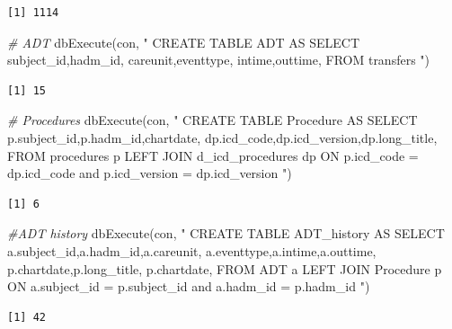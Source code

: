 \documentclass[
]{article}
\newenvironment{Shaded}{\begin{snugshade}}{\end{snugshade}}
\newcommand{\CommentTok}[1]{\textcolor[rgb]{0.56,0.35,0.01}{\textit{#1}}}
\newcommand{\FunctionTok}[1]{\textcolor[rgb]{0.00,0.00,0.00}{#1}}
\newcommand{\NormalTok}[1]{\textcolor[rgb]{0.00,0.00,0.00}{#1}}
\newcommand{\StringTok}[1]{\textcolor[rgb]{0.31,0.60,0.02}{#1}}
\begin{document}
\begin{verbatim}
[1] 1114
\end{verbatim}

\begin{Shaded}
\begin{Highlighting}[]
\CommentTok{\# ADT }
\FunctionTok{dbExecute}\NormalTok{(con, }\StringTok{"}
\StringTok{  CREATE TABLE ADT AS}
\StringTok{  SELECT}
\StringTok{    subject\_id,hadm\_id,}
\StringTok{    careunit,eventtype,}
\StringTok{    intime,outtime,}
\StringTok{  FROM transfers}
\StringTok{"}\NormalTok{)}
\end{Highlighting}
\end{Shaded}

\begin{verbatim}
[1] 15
\end{verbatim}

\begin{Shaded}
\begin{Highlighting}[]
\CommentTok{\# Procedures}
\FunctionTok{dbExecute}\NormalTok{(con, }\StringTok{"}
\StringTok{  CREATE TABLE Procedure AS}
\StringTok{  SELECT }
\StringTok{    p.subject\_id,p.hadm\_id,chartdate,  }
\StringTok{    dp.icd\_code,dp.icd\_version,dp.long\_title, }
\StringTok{  FROM procedures p}
\StringTok{  LEFT JOIN d\_icd\_procedures dp}
\StringTok{  ON p.icd\_code = dp.icd\_code and p.icd\_version = dp.icd\_version}
\StringTok{"}\NormalTok{)}
\end{Highlighting}
\end{Shaded}

\begin{verbatim}
[1] 6
\end{verbatim}

\begin{Shaded}
\begin{Highlighting}[]
\CommentTok{\#ADT history}
\FunctionTok{dbExecute}\NormalTok{(con, }\StringTok{"}
\StringTok{  CREATE TABLE ADT\_history AS}
\StringTok{  SELECT }
\StringTok{    a.subject\_id,a.hadm\_id,a.careunit,}
\StringTok{    a.eventtype,a.intime,a.outtime,}
\StringTok{    p.chartdate,p.long\_title, }
\StringTok{    p.chartdate,  }
\StringTok{  FROM ADT a}
\StringTok{  LEFT JOIN Procedure p}
\StringTok{  ON a.subject\_id = p.subject\_id and a.hadm\_id = p.hadm\_id}
\StringTok{"}\NormalTok{)}
\end{Highlighting}
\end{Shaded}

\begin{verbatim}
[1] 42
\end{verbatim}
\end{document}
